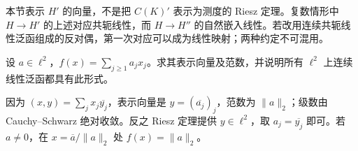 \begin{remark}[三种表示须分清]
本节表示 $H'$ 的向量，不是把 $C(K)'$ 表示为测度的 Riesz 定理。复数情形中 $H\to H'$ 的上述对应共轭线性，而 $H\to H''$ 的自然嵌入线性。若改用连续共轭线性泛函组成的反对偶，第一次对应可以成为线性映射；两种约定不可混用。
\end{remark}

\begin{exercise}
设 $a\in\ell^2$，$f(x)=\sum_{j\ge1}a_jx_j$。求其表示向量及范数，并说明所有 $\ell^2$ 上连续线性泛函都具有此形式。
\end{exercise}
\begin{solution}
因为 $(x,y)=\sum_jx_j\overline{y_j}$，表示向量是 $y=(\overline{a_j})_j$，范数为 $\|a\|_2$；级数由 Cauchy--Schwarz 绝对收敛。反之 Riesz 定理提供 $y\in\ell^2$，取 $a_j=\overline{y_j}$ 即可。若 $a\ne0$，在 $x=\overline a/\|a\|_2$ 处 $f(x)=\|a\|_2$。
\end{solution}
